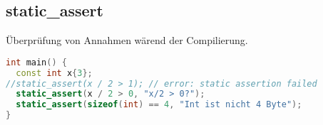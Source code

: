\documentclass[10pt,twocolumn]{scrartcl}
\begin{document}
\subsection{static\_assert}

Überprüfung von Annahmen wärend der Compilierung.

\begin{lstlisting}[language=C++]
int main() {
  const int x{3};
//static_assert(x / 2 > 1); // error: static assertion failed
  static_assert(x / 2 > 0, "x/2 > 0?");
  static_assert(sizeof(int) == 4, "Int ist nicht 4 Byte");
}
\end{lstlisting}









\end{document}
